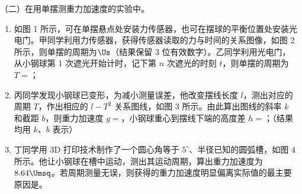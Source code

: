\documentclass[\gkver]{gaokaozhenti}
\begin{document}
\begin{enumerate}
（二）在用单摆测重力加速度的实验中。


\begin{enumerate}
	\item
	如图 1 所示，可在单摆悬点处安装力传感器，也可在摆球的平衡位置处安装光电门。甲同学利用力传感器，获得传感器读取的力与时间的关系图像，如图 2 所示，则单摆的周期为$\Us$（结果保留 3 位有效数字）。乙同学利用光电门，从小钢球第 1 次遮光开始计时，记下第 $n$ 次遮光的时刻 $t$，则单摆的周期为 $T =$；
	\item
	丙同学发现小钢球已变形，为减小测量误差，他改变摆线长度 $l$，测出对应的周期 $T$，作出相应的 $l-T^{2}$ 关系图线，如图 3 所示。由此算出图线的斜率 $k$ 和截距 $b$，则重力加速度 $g =$，小钢球重心到摆线下端的高度差 $h =$；（结果均用 $k$、$b$ 表示）
	\item
	丁同学用 3D 打印技术制作了一个圆心角等于 $5^{\circ}$、半径已知的圆弧槽，如图 4 所示。他让小钢球在槽中运动，测出其运动周期，算出重力加速度为 $8.64\Umsq$。若周期测量无误，则获得的重力加速度明显偏离实际值的最主要原因是。
\end{enumerate}

\end{enumerate}
\end{document}
